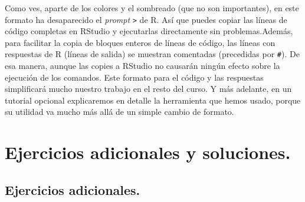 \documentclass[10pt,a4paper]{article}\usepackage[]{graphicx}\usepackage[]{color}
\begin{document}
Como ves, aparte de los colores y el sombreado (que no son importantes), en este formato ha desaparecido el {\em prompt} {\tt >} de R. Así que puedes copiar las líneas de código completas en RStudio y ejecutarlas directamente sin problemas.Además, para facilitar la copia de bloques enteros de líneas de código, las líneas con respuestas de R (líneas de salida) se muestran comentadas (precedidas por \verb/#/). De esa manera, aunque las copies a RStudio no causarán ningún efecto sobre la ejecución de los comandos. Este formato para el código y las respuestas simplificará mucho  nuestro trabajo en el resto del curso. Y más adelante, en un tutorial opcional explicaremos en detalle la herramienta que hemos usado, porque su utilidad va mucho más allá de un simple cambio de formato.


\section{Ejercicios adicionales y soluciones.}
\label{tut02:sec:SolucionesEjerciciosAdicionales}

\subsection*{Ejercicios adicionales.}
\end{document}
